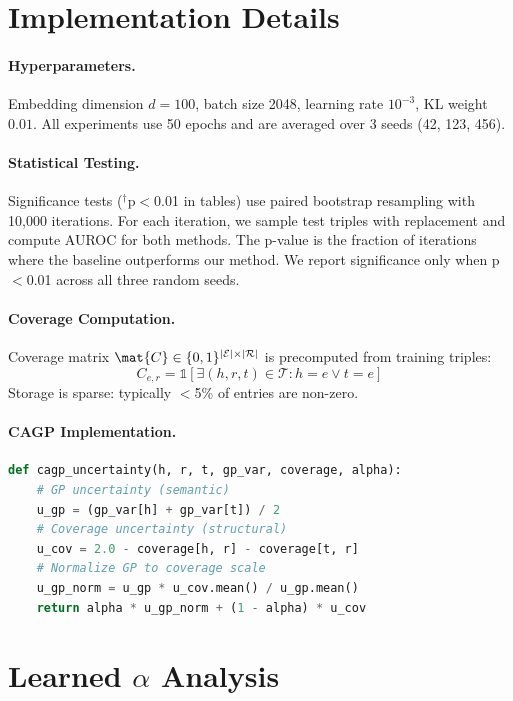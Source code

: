 \section{Implementation Details}
\label{app:implementation}

\paragraph{Hyperparameters.}
Embedding dimension $d=100$, batch size 2048, learning rate $10^{-3}$, KL weight $0.01$.
All experiments use 50 epochs and are averaged over 3 seeds (42, 123, 456).

\paragraph{Statistical Testing.}
Significance tests ($^\dagger$p$<$0.01 in tables) use paired bootstrap resampling with 10,000 iterations.
For each iteration, we sample test triples with replacement and compute AUROC for both methods.
The p-value is the fraction of iterations where the baseline outperforms our method.
We report significance only when p$<$0.01 across all three random seeds.

\paragraph{Coverage Computation.}
Coverage matrix $\mat{C} \in \{0,1\}^{|\mathcal{E}| \times |\mathcal{R}|}$ is precomputed from training triples:
\begin{equation}
    C_{e,r} = \mathbb{1}[\exists (h,r,t) \in \mathcal{T} : h=e \lor t=e]
\end{equation}
Storage is sparse: typically $<$5\% of entries are non-zero.

\paragraph{CAGP Implementation.}
\begin{lstlisting}[language=Python]
def cagp_uncertainty(h, r, t, gp_var, coverage, alpha):
    # GP uncertainty (semantic)
    u_gp = (gp_var[h] + gp_var[t]) / 2
    # Coverage uncertainty (structural)
    u_cov = 2.0 - coverage[h, r] - coverage[t, r]
    # Normalize GP to coverage scale
    u_gp_norm = u_gp * u_cov.mean() / u_gp.mean()
    return alpha * u_gp_norm + (1 - alpha) * u_cov
\end{lstlisting}

\section{Learned $\alpha$ Analysis}
\label{app:alpha}

